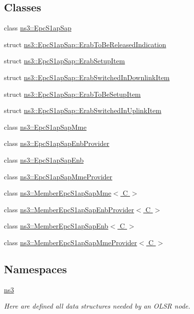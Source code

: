 \subsection*{Classes}
\begin{DoxyCompactItemize}
\item 
class \hyperlink{classns3_1_1EpcS1apSap}{ns3\+::\+Epc\+S1ap\+Sap}
\item 
struct \hyperlink{structns3_1_1EpcS1apSap_1_1ErabToBeReleasedIndication}{ns3\+::\+Epc\+S1ap\+Sap\+::\+Erab\+To\+Be\+Released\+Indication}
\item 
struct \hyperlink{structns3_1_1EpcS1apSap_1_1ErabSetupItem}{ns3\+::\+Epc\+S1ap\+Sap\+::\+Erab\+Setup\+Item}
\item 
struct \hyperlink{structns3_1_1EpcS1apSap_1_1ErabSwitchedInDownlinkItem}{ns3\+::\+Epc\+S1ap\+Sap\+::\+Erab\+Switched\+In\+Downlink\+Item}
\item 
struct \hyperlink{structns3_1_1EpcS1apSap_1_1ErabToBeSetupItem}{ns3\+::\+Epc\+S1ap\+Sap\+::\+Erab\+To\+Be\+Setup\+Item}
\item 
struct \hyperlink{structns3_1_1EpcS1apSap_1_1ErabSwitchedInUplinkItem}{ns3\+::\+Epc\+S1ap\+Sap\+::\+Erab\+Switched\+In\+Uplink\+Item}
\item 
class \hyperlink{classns3_1_1EpcS1apSapMme}{ns3\+::\+Epc\+S1ap\+Sap\+Mme}
\item 
class \hyperlink{classns3_1_1EpcS1apSapEnbProvider}{ns3\+::\+Epc\+S1ap\+Sap\+Enb\+Provider}
\item 
class \hyperlink{classns3_1_1EpcS1apSapEnb}{ns3\+::\+Epc\+S1ap\+Sap\+Enb}
\item 
class \hyperlink{classns3_1_1EpcS1apSapMmeProvider}{ns3\+::\+Epc\+S1ap\+Sap\+Mme\+Provider}
\item 
class \hyperlink{classns3_1_1MemberEpcS1apSapMme}{ns3\+::\+Member\+Epc\+S1ap\+Sap\+Mme$<$ C $>$}
\item 
class \hyperlink{classns3_1_1MemberEpcS1apSapEnbProvider}{ns3\+::\+Member\+Epc\+S1ap\+Sap\+Enb\+Provider$<$ C $>$}
\item 
class \hyperlink{classns3_1_1MemberEpcS1apSapEnb}{ns3\+::\+Member\+Epc\+S1ap\+Sap\+Enb$<$ C $>$}
\item 
class \hyperlink{classns3_1_1MemberEpcS1apSapMmeProvider}{ns3\+::\+Member\+Epc\+S1ap\+Sap\+Mme\+Provider$<$ C $>$}
\end{DoxyCompactItemize}
\subsection*{Namespaces}
\begin{DoxyCompactItemize}
\item 
 \hyperlink{namespacens3}{ns3}
\begin{DoxyCompactList}\small\item\em Here are defined all data structures needed by an O\+L\+SR node. \end{DoxyCompactList}\end{DoxyCompactItemize}
